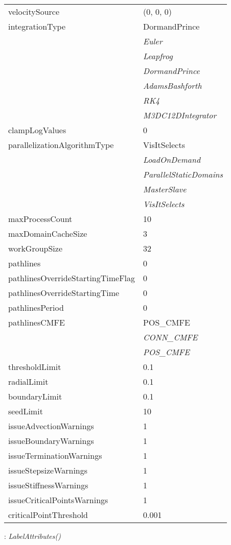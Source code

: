 \documentclass[10pt,a4paper]{report}
\begin{document}
\begin{longtable}{ll}
velocitySource  &  (0, 0, 0) \\
integrationType  &  DormandPrince   \\
 & {\it  Euler} \\
 & {\it  Leapfrog} \\
 & {\it  DormandPrince} \\
 & {\it  AdamsBashforth} \\
 & {\it  RK4} \\
 & {\it  M3DC12DIntegrator} \\
clampLogValues  &  0 \\
parallelizationAlgorithmType  &  VisItSelects   \\
 & {\it  LoadOnDemand} \\
 & {\it  ParallelStaticDomains} \\
 & {\it  MasterSlave} \\
 & {\it  VisItSelects} \\
maxProcessCount  &  10 \\
maxDomainCacheSize  &  3 \\
workGroupSize  &  32 \\
pathlines  &  0 \\
pathlinesOverrideStartingTimeFlag  &  0 \\
pathlinesOverrideStartingTime  &  0 \\
pathlinesPeriod  &  0 \\
pathlinesCMFE  &  POS\_CMFE   \\
 & {\it  CONN\_CMFE} \\
 & {\it  POS\_CMFE} \\
thresholdLimit  &  0.1 \\
radialLimit  &  0.1 \\
boundaryLimit  &  0.1 \\
seedLimit  &  10 \\
issueAdvectionWarnings  &  1 \\
issueBoundaryWarnings  &  1 \\
issueTerminationWarnings  &  1 \\
issueStepsizeWarnings  &  1 \\
issueStiffnessWarnings  &  1 \\
issueCriticalPointsWarnings  &  1 \\
criticalPointThreshold  &  0.001 \\
\end{longtable}

\newpage

{}
: {\it LabelAttributes() }\\[-3mm]
\end{document}
